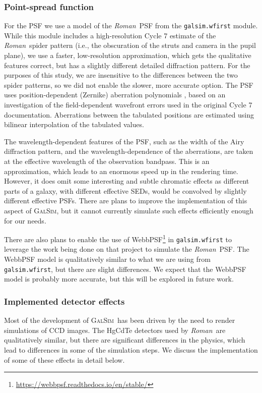 \documentclass[usenatbib]{mnras}
\newcommand{\galsim}{\textsc{GalSim}}
\newcommand{\wfirst}{{\slshape Roman}}
\begin{document}
\subsubsection{Point-spread function}\label{psf}

For the PSF we use a model of the \wfirst\ PSF from the \texttt{galsim.wfirst} module.
While this module includes a high-resolution Cycle 7 estimate of the \wfirst\ spider pattern (i.e., the obscuration of the struts and camera in the pupil plane), we use a faster, low-resolution approximation, which gets the qualitative features correct, but has a slightly different detailed diffraction pattern.  
For the purposes of this study, we are insensitive to the differences between the two spider patterns, so we did not enable the slower, more accurate option.
The PSF uses position-dependent (Zernike) aberration polynomials \citep{noll1976}, based on an investigation of the field-dependent wavefront errors used in the original Cycle 7 documentation.
Aberrations between the tabulated positions are estimated using bilinear interpolation of the tabulated values.

The wavelength-dependent features of the PSF, such as the width of the Airy diffraction pattern, and the wavelength-dependence of the aberrations, are taken at the effective wavelength of the observation bandpass.
This is an approximation, which leads to an enormous speed up in the rendering time.
However, it does omit some interesting and subtle chromatic effects as different parts of a galaxy, with different effective SEDs, would be convolved by slightly different effective PSFs.
There are plans to improve the implementation of this aspect of \galsim, but it cannot currently simulate such effects efficiently enough for our needs.

There are also plans to enable the use of WebbPSF\footnote{\url{https://webbpsf.readthedocs.io/en/stable/}} in \texttt{galsim.wfirst} to leverage the work being done on that project to simulate the \wfirst\ PSF.
The WebbPSF model is qualitatively similar to what we are using from \texttt{galsim.wfirst}, but there are slight differences.
We expect that the WebbPSF model is probably more accurate, but this will be explored in future work.

\subsubsection{Implemented detector effects}\label{effects}

Most of the development of \galsim\ has been driven by the need to render simulations of CCD images.
The HgCdTe detectors used by \wfirst\ are qualitatively similar, but there are significant differences in the physics, which lead to differences in some of the simulation steps. We discuss the implementation of some of these effects in detail below. 
\end{document}
